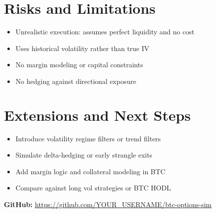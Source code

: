 \documentclass[a4paper,10pt]{article}
\begin{document}
\section*{Risks and Limitations}
\begin{itemize}
  \item Unrealistic execution: assumes perfect liquidity and no cost
  \item Uses historical volatility rather than true IV
  \item No margin modeling or capital constraints
  \item No hedging against directional exposure
\end{itemize}

\section*{Extensions and Next Steps}
\begin{itemize}
  \item Introduce volatility regime filters or trend filters
  \item Simulate delta-hedging or early strangle exits
  \item Add margin logic and collateral modeling in BTC
  \item Compare against long vol strategies or BTC HODL
\end{itemize}

\noindent \textbf{GitHub:} \url{https://github.com/YOUR_USERNAME/btc-options-sim}
\end{document}
